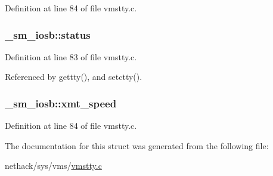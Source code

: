 Definition at line 84 of file vmstty.\+c.

\hypertarget{struct__sm__iosb_afff4b38c827f86942891823ba8b917ec}{
\subsubsection[{status}]{ \+\_\+sm\+\_\+iosb\+::status}}\label{struct__sm__iosb_afff4b38c827f86942891823ba8b917ec}


Definition at line 83 of file vmstty.\+c.



Referenced by gettty(), and setctty().

\hypertarget{struct__sm__iosb_a53275f08bd6534d558dd954f38c1ebe8}{
\subsubsection[{xmt\+\_\+speed}]{ \+\_\+sm\+\_\+iosb\+::xmt\+\_\+speed}}\label{struct__sm__iosb_a53275f08bd6534d558dd954f38c1ebe8}


Definition at line 84 of file vmstty.\+c.



The documentation for this struct was generated from the following file\+:\begin{DoxyCompactItemize}
\item 
nethack/sys/vms/\hyperlink{vmstty_8c}{vmstty.\+c}\end{DoxyCompactItemize}

